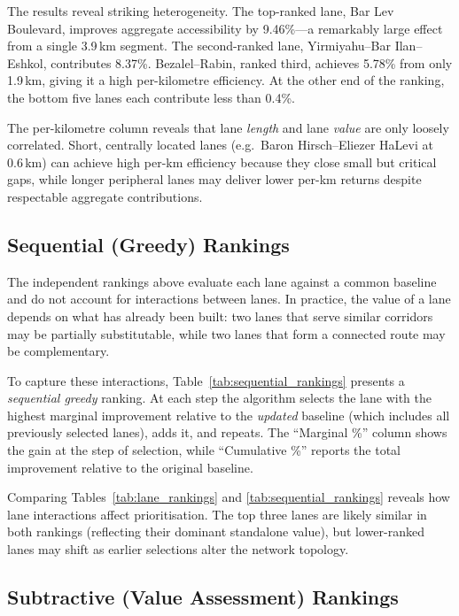 \documentclass[12pt,a4paper]{article}
\begin{document}


The results reveal striking heterogeneity. The top-ranked lane, Bar Lev Boulevard, improves aggregate accessibility by 9.46\%---a remarkably large effect from a single 3.9\,km segment. The second-ranked lane, Yirmiyahu--Bar Ilan--Eshkol, contributes 8.37\%. Bezalel--Rabin, ranked third, achieves 5.78\% from only 1.9\,km, giving it a high per-kilometre efficiency. At the other end of the ranking, the bottom five lanes each contribute less than 0.4\%.

The per-kilometre column reveals that lane \emph{length} and lane \emph{value} are only loosely correlated. Short, centrally located lanes (e.g.\ Baron Hirsch--Eliezer HaLevi at 0.6\,km) can achieve high per-km efficiency because they close small but critical gaps, while longer peripheral lanes may deliver lower per-km returns despite respectable aggregate contributions.

\subsection{Sequential (Greedy) Rankings}
\label{sec:sequential}

The independent rankings above evaluate each lane against a common baseline and do not account for interactions between lanes. In practice, the value of a lane depends on what has already been built: two lanes that serve similar corridors may be partially substitutable, while two lanes that form a connected route may be complementary.

To capture these interactions, Table~\ref{tab:sequential_rankings} presents a \emph{sequential greedy} ranking. At each step the algorithm selects the lane with the highest marginal improvement relative to the \emph{updated} baseline (which includes all previously selected lanes), adds it, and repeats. The ``Marginal \%'' column shows the gain at the step of selection, while ``Cumulative \%'' reports the total improvement relative to the original baseline.



Comparing Tables~\ref{tab:lane_rankings} and \ref{tab:sequential_rankings} reveals how lane interactions affect prioritisation. The top three lanes are likely similar in both rankings (reflecting their dominant standalone value), but lower-ranked lanes may shift as earlier selections alter the network topology.

\subsection{Subtractive (Value Assessment) Rankings}
\label{sec:subtractive}
\end{document}
